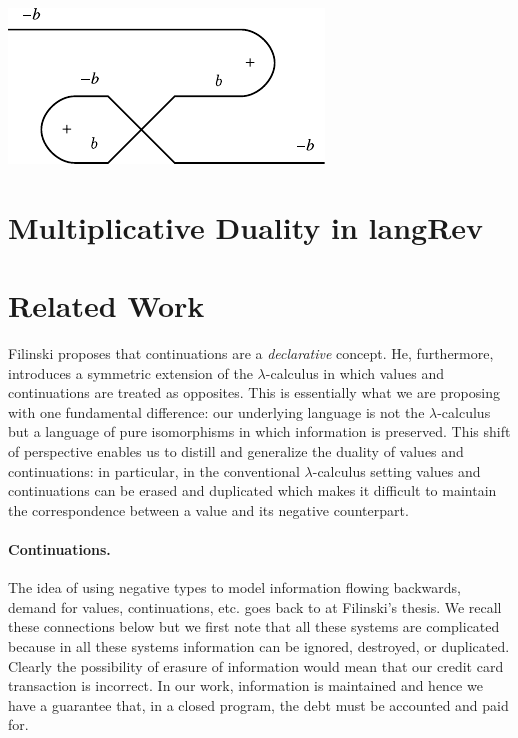 \documentclass[preprint]{sigplanconf}
\begin{document}
\begin{itemize}
\begin{center}
  \includegraphics{diagrams/neg_circuit2.pdf}
\end{center}

\end{itemize}

\section{Multiplicative Duality in {{langRev}} }

\section{Related Work} 
\label{sec:related}

Filinski proposes that continuations are a \emph{declarative} concept. He,
furthermore, introduces a symmetric extension of the $\lambda$-calculus in
which values and continuations are treated as opposites. This is essentially
what we are proposing with one fundamental difference: our underlying
language is not the $\lambda$-calculus but a language of pure isomorphisms in
which information is preserved. This shift of perspective enables us to
distill and generalize the duality of values and continuations: in
particular, in the conventional $\lambda$-calculus setting values and
continuations can be erased and duplicated which makes it difficult to
maintain the correspondence between a value and its negative counterpart. 

\paragraph*{Continuations.} The idea of using negative types to model
information flowing backwards, demand for values, continuations, etc. goes
back to at Filinski's thesis. We recall these connections below but we first
note that all these systems are complicated because in all these systems
information can be ignored, destroyed, or duplicated. Clearly the possibility
of erasure of information would mean that our credit card transaction is
incorrect. In our work, information is maintained and hence we have a
guarantee that, in a closed program, the debt must be accounted and paid for.
\end{document}
